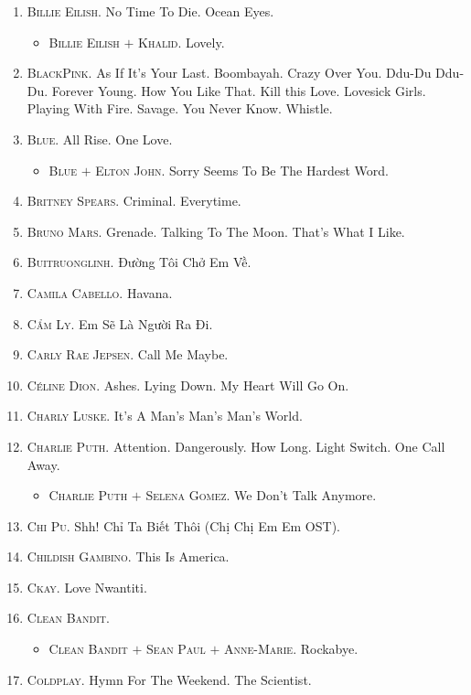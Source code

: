 \documentclass[oneside]{book}
\numberwithin{equation}{section}
\begin{document}
\begin{enumerate}
	\item \textsc{Billie Eilish.} No Time To Die. Ocean Eyes.
	\begin{itemize}
		\item \textsc{Billie Eilish $+$ Khalid.} Lovely.
	\end{itemize}
	\item \textsc{BlackPink.} As If It's Your Last. Boombayah. Crazy Over You. Ddu-Du Ddu-Du. Forever Young. How You Like That. Kill this Love. Lovesick Girls. Playing With Fire. Savage. You Never Know. Whistle.
	\item \textsc{Blue.} All Rise. One Love.
	\begin{itemize}
		\item \textsc{Blue $+$ Elton John.} Sorry Seems To Be The Hardest Word.
	\end{itemize}
	\item \textsc{Britney Spears.} Criminal. Everytime.
	\item \textsc{Bruno Mars.} Grenade. Talking To The Moon. That's What I Like.
	\item \textsc{Buitruonglinh.} Đường Tôi Chở Em Về.
	\item \textsc{Camila Cabello.} Havana.
	\item \textsc{Cẩm Ly.} Em Sẽ Là Người Ra Đi.
	\item \textsc{Carly Rae Jepsen.} Call Me Maybe.
	\item \textsc{C\'eline Dion.} Ashes. Lying Down. My Heart Will Go On.
	\item \textsc{Charly Luske.} It's A Man's Man's Man's World.
	\item \textsc{Charlie Puth.} Attention. Dangerously. How Long. Light Switch. One Call Away.
	\begin{itemize}
		\item \textsc{Charlie Puth $+$ Selena Gomez.} We Don't Talk Anymore.
	\end{itemize}
	\item \textsc{Chi Pu.} Shh! Chỉ Ta Biết Thôi (Chị Chị Em Em OST).
	\item \textsc{Childish Gambino.} This Is America.
	\item \textsc{Ckay.} Love Nwantiti.
	\item \textsc{Clean Bandit.}
	\begin{itemize}
		\item \textsc{Clean Bandit $+$ Sean Paul $+$ Anne-Marie.} Rockabye.
	\end{itemize}
	\item \textsc{Coldplay.} Hymn For The Weekend. The Scientist.

\end{enumerate}
\end{document}
